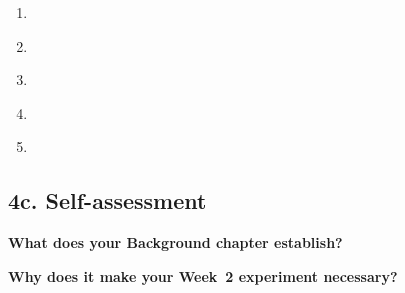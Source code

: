 \begin{enumerate}
  \item \underline{\hspace{13cm}} \\[4pt]
        \underline{\hspace{13cm}}
  \vspace{0.3cm}
  \item \underline{\hspace{13cm}} \\[4pt]
        \underline{\hspace{13cm}}
  \vspace{0.3cm}
  \item \underline{\hspace{13cm}} \\[4pt]
        \underline{\hspace{13cm}}
  \vspace{0.3cm}
  \item \underline{\hspace{13cm}} \\[4pt]
        \underline{\hspace{13cm}}
  \vspace{0.3cm}
  \item \underline{\hspace{13cm}} \\[4pt]
        \underline{\hspace{13cm}}
\end{enumerate}

\subsection*{4c. Self-assessment}


\noindent\textbf{What does your Background chapter establish?}

\vspace{0.2cm}
\noindent\underline{\hspace{14cm}}

\vspace{0.3cm}
\noindent\underline{\hspace{14cm}}

\vspace{0.5cm}

\noindent\textbf{Why does it make your Week~2 experiment necessary?}

\vspace{0.2cm}
\noindent\underline{\hspace{14cm}}

\vspace{0.3cm}
\noindent\underline{\hspace{14cm}}